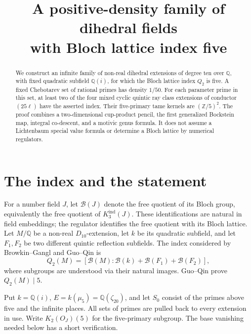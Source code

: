 \documentclass[11pt]{article}
\title{A positive-density family of dihedral fields\protect\\with Bloch lattice index five}
\author{}\date{}
\theoremstyle{remark}\newtheorem{remark}[theorem]{Remark}
\newcommand{\Q}{\mathbb Q}\newcommand{\Z}{\mathbb Z}
\begin{document}
\maketitle
\begin{abstract}
We construct an infinite family of non-real dihedral extensions of degree ten over
\(\Q\), with fixed quadratic subfield \(\Q(i)\), for which the Bloch lattice index
\(Q_2\) is five. A fixed Chebotarev set of rational primes has density \(1/50\).
For each parameter prime in this set, at least two of the four mixed cyclic
quintic ray class extensions of conductor \((25\ell)\) have the asserted index.
Their five-primary tame kernels are \((\Z/5)^2\). The proof combines a
two-dimensional cup-product pencil, the first generalized Bockstein map, integral
co-descent, and a motivic genus formula. It does not assume a Lichtenbaum special
value formula or determine a Bloch lattice by numerical regulators.
\end{abstract}

\section{The index and the statement}
For a number field \(J\), let \(\mathcal B(J)\) denote the free quotient of its
Bloch group, equivalently the free quotient of \(K_3^{\mathrm{ind}}(J)\).
These identifications are natural in field embeddings; the regulator identifies
the free quotient with its Bloch lattice. Let \(M/\Q\) be a non-real
\(D_{10}\)-extension, let \(k\) be its quadratic subfield, and let
\(F_1,F_2\) be two different quintic reflection subfields. The index considered
by Browkin--Gangl and Guo--Qin is
\[
 Q_2(M)=[\mathcal B(M):\mathcal B(k)+\mathcal B(F_1)+\mathcal B(F_2)],
\]
where subgroups are understood via their natural images. Guo--Qin
\cite[Theorem 4.3]{GQ} prove \(Q_2(M)\mid5\).

Put \(k=\Q(i)\), \(E=k(\mu_5)=\Q(\zeta_{20})\), and let \(S_0\) consist of
the primes above five and the infinite places. All sets of primes are pulled
back to every extension in use. Write \(K_2(O_J)(5)\) for the five-primary
subgroup. The base vanishing needed below has a short verification.
\end{document}

